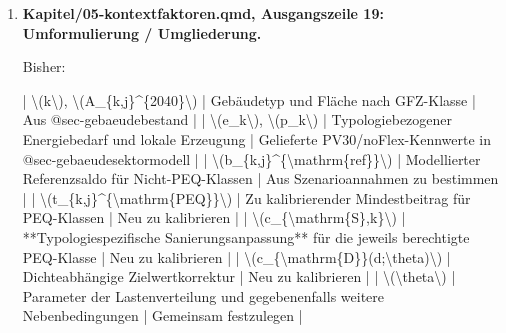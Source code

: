 \documentclass[
  ngerman,
  a4paper,
  DIV=11]{scrreprt}
\newenvironment{Shaded}{\begin{snugshade}}{\end{snugshade}}
\newcommand{\NormalTok}[1]{\textcolor[rgb]{0.00,0.23,0.31}{#1}}
\begin{document}
\begin{enumerate}
  Jetzt:

\begin{Shaded}
\begin{Highlighting}[]
\NormalTok{Für jede neue energetische Typologie $k$ werden die relevanten jährlichen Bedarfe, Erzeugungsannahmen, Bewertungsgrenzen und Anforderungsparameter aus dem Gebäudeszenario beziehungsweise der Kalibrierung dokumentiert. Dabei ist zwischen zwei Rollen zu unterscheiden: **Nicht{-}PEQ{-}Klassen** gehen mit ihrem begründeten, szenariotypischen Bilanzbeitrag in die nationale Aggregation ein; für **PEQ{-}Klassen** wird die erforderliche Bilanzqualität als Zielwertfunktion bestimmt. Eine bestimmte PV{-}Ausstattung oder ein spezifischer Energiebedarf ist nicht automatisch bereits ein allgemein geltender PEQ{-}Grenzwert.}
\end{Highlighting}
\end{Shaded}
\item
  \textbf{Kapitel/05-kontextfaktoren.qmd, Ausgangszeile 19:
  Umformulierung / Umgliederung.}

  Bisher:

\begin{Shaded}
\begin{Highlighting}[]
\NormalTok{| \textbackslash{}(k\textbackslash{}), \textbackslash{}(A\_\{k,j\}\^{}\{2040\}\textbackslash{}) | Gebäudetyp und Fläche nach GFZ{-}Klasse | Aus @sec{-}gebaeudebestand |}
\NormalTok{| \textbackslash{}(e\_k\textbackslash{}), \textbackslash{}(p\_k\textbackslash{}) | Typologiebezogener Energiebedarf und lokale Erzeugung | Gelieferte PV30/noFlex{-}Kennwerte in @sec{-}gebaeudesektormodell |}
\NormalTok{| \textbackslash{}(b\_\{k,j\}\^{}\{\textbackslash{}mathrm\{ref\}\}\textbackslash{}) | Modellierter Referenzsaldo für Nicht{-}PEQ{-}Klassen | Aus Szenarioannahmen zu bestimmen |}
\NormalTok{| \textbackslash{}(t\_\{k,j\}\^{}\{\textbackslash{}mathrm\{PEQ\}\}\textbackslash{}) | Zu kalibrierender Mindestbeitrag für PEQ{-}Klassen | Neu zu kalibrieren |}
\NormalTok{| \textbackslash{}(c\_\{\textbackslash{}mathrm\{S\},k\}\textbackslash{}) | **Typologiespezifische Sanierungsanpassung** für die jeweils berechtigte PEQ{-}Klasse | Neu zu kalibrieren |}
\NormalTok{| \textbackslash{}(c\_\{\textbackslash{}mathrm\{D\}\}(d;\textbackslash{}theta)\textbackslash{}) | Dichteabhängige Zielwertkorrektur | Neu zu kalibrieren |}
\NormalTok{| \textbackslash{}(\textbackslash{}theta\textbackslash{}) | Parameter der Lastenverteilung und gegebenenfalls weitere Nebenbedingungen | Gemeinsam festzulegen |}
\end{Highlighting}
\end{Shaded}


\end{enumerate}
\end{document}
